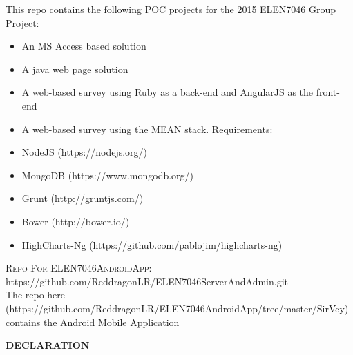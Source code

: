 \documentclass[12pt]{witseiepaper}
\begin{document}
This repo contains the following POC projects for the 2015 ELEN7046 Group Project:
\begin{itemize}
\item An MS Access based solution
\item A java web page solution
\item A web-based survey using Ruby as a back-end and AngularJS as the front-end
\item A web-based survey using the MEAN stack. Requirements:
\item NodeJS (https://nodejs.org/)
\item MongoDB (https://www.mongodb.org/)
\item Grunt (http://gruntjs.com/)
\item Bower (http://bower.io/)
\item HighCharts-Ng (https://github.com/pablojim/highcharts-ng)
\end{itemize}



\textsc{Repo For ELEN7046AndroidApp:} \\https://github.com/ReddragonLR/ELEN7046ServerAndAdmin.git \\
 
The repo here (https://github.com/ReddragonLR/ELEN7046AndroidApp/tree/master/SirVey) contains the Android Mobile Application



\clearpage %

 \thispagestyle{empty}\pagestyle{empty}
 \begin{center}
  \textsc{\bfseries DECLARATION} \\ [1.0cm]
 \end{center}
\end{document}
